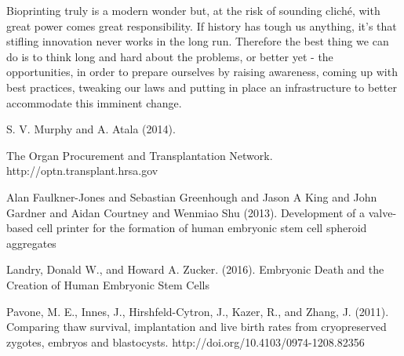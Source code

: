\documentclass[12pt]{article} %
\begin{document}
Bioprinting truly is a modern wonder but, at the risk of sounding cliché, with great power comes great responsibility. 
If history has tough us anything, it's that stifling innovation never works in the long run. Therefore the best thing we can do is to think long and hard about the problems, or better yet - the opportunities, in order to prepare ourselves by raising awareness, coming up with best practices, tweaking our laws and putting in place an infrastructure to better accommodate this imminent change.

\newpage


\begin{thebibliography}{99} %
\begin{small}
\newblock S. V. Murphy and A. Atala (2014).

\newblock The Organ Procurement and Transplantation Network.
\newblock http://optn.transplant.hrsa.gov

\newblock Alan Faulkner-Jones and Sebastian Greenhough and Jason A King and John Gardner and Aidan Courtney and Wenmiao Shu (2013).
\newline Development of a valve-based cell printer for the formation of human embryonic stem cell spheroid aggregates

\newblock Landry, Donald W., and Howard A. Zucker. (2016).
\newline Embryonic Death and the Creation of Human Embryonic Stem Cells

\newblock Pavone, M. E., Innes, J., Hirshfeld-Cytron, J., Kazer, R., and Zhang, J. (2011).
\newline Comparing thaw survival, implantation and live birth rates from cryopreserved zygotes, embryos and blastocysts. 
\newblock http://doi.org/10.4103/0974-1208.82356


\end{small}
\end{thebibliography}
\end{document}
